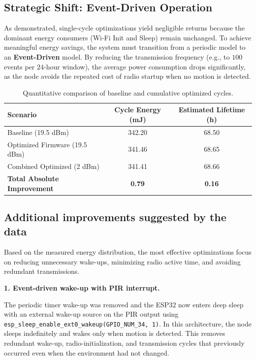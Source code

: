 \documentclass[11pt,a4paper]{article}
\begin{document}
\subsection{Strategic Shift: Event-Driven Operation}
As demonstrated, single-cycle optimizations yield negligible returns because the dominant energy consumers (Wi-Fi Init and Sleep) remain unchanged. To achieve meaningful energy savings, the system must transition from a periodic model to an \textbf{Event-Driven} model. By reducing the transmission frequency (e.g., to $100$ events per $24$-hour window), the average power consumption drops significantly, as the node avoids the repeated cost of radio startup when no motion is detected.
\begin{table}[H]
\centering
\caption{Quantitative comparison of baseline and cumulative optimized cycles.}
\label{tab:final_comparison}
\begin{tabular}{lcc}
\toprule
Scenario & Cycle Energy (mJ) & Estimated Lifetime (h) \\
\midrule
Baseline (19.5 dBm) & 342.20 & 68.50 \\
Optimized Firmware (19.5 dBm) & 341.46 & 68.65 \\
Combined Optimized (2 dBm) & 341.41 & 68.66 \\
\midrule
\textbf{Total Absolute Improvement} & \textbf{0.79} & \textbf{0.16} \\
\bottomrule
\end{tabular}
\end{table}

\subsection{Additional improvements suggested by the data}

Based on the measured energy distribution, the most effective optimizations focus on reducing unnecessary wake-ups, minimizing radio active time, and avoiding redundant transmissions.

\textbf{1. Event-driven wake-up with PIR interrupt.}

The periodic timer wake-up was removed and the ESP32 now enters deep sleep with an external wake-up source on the PIR output using \texttt{esp\_sleep\_enable\_ext0\_wakeup(GPIO\_NUM\_34, 1)}. In this architecture, the node sleeps indefinitely and wakes only when motion is detected. This removes redundant wake-up, radio-initialization, and transmission cycles that previously occurred even when the environment had not changed.
\end{document}
